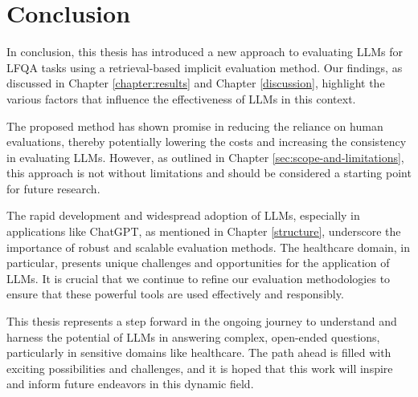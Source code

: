 \section{Conclusion}
In conclusion, this thesis has introduced a new approach to evaluating LLMs for LFQA tasks using a retrieval-based implicit evaluation method. Our findings, as discussed in Chapter \ref{chapter:results} and Chapter \ref{discussion}, highlight the various factors that influence the effectiveness of LLMs in this context.

The proposed method has shown promise in reducing the reliance on human evaluations, thereby potentially lowering the costs and increasing the consistency in evaluating LLMs. However, as outlined in Chapter \ref{sec:scope-and-limitations}, this approach is not without limitations and should be considered a starting point for future research.

The rapid development and widespread adoption of LLMs, especially in applications like ChatGPT, as mentioned in Chapter \ref{structure}, underscore the importance of robust and scalable evaluation methods. The healthcare domain, in particular, presents unique challenges and opportunities for the application of LLMs. It is crucial that we continue to refine our evaluation methodologies to ensure that these powerful tools are used effectively and responsibly.

This thesis represents a step forward in the ongoing journey to understand and harness the potential of LLMs in answering complex, open-ended questions, particularly in sensitive domains like healthcare. The path ahead is filled with exciting possibilities and challenges, and it is hoped that this work will inspire and inform future endeavors in this dynamic field.

